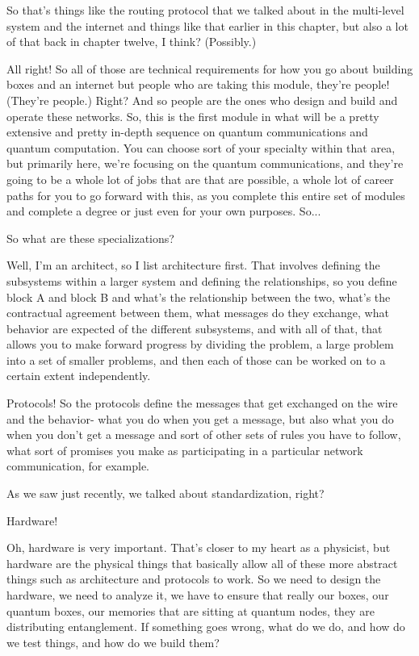 So that's things like the routing protocol that we talked about in the multi-level system and the internet and things like that earlier in this chapter, but also a lot of that back in chapter twelve, I think? (Possibly.)

All right! So all of those are technical requirements for how you go about building boxes and an internet but people who are taking this module, they're people! (They're people.) Right? And so people are the ones who design and build and operate these networks. So, this is the first module in what will be a pretty extensive and pretty in-depth sequence on quantum communications and quantum computation. You can choose sort of your specialty within that area, but primarily here, we're focusing on the quantum communications, and they're going to be a whole lot of jobs that are that are possible, a whole lot of career paths for you to go forward with this, as you complete this entire set of modules and complete a degree or just even for your own purposes. So...

So what are these specializations?

Well, I'm an architect, so I list architecture first. That involves defining the subsystems within a larger system and defining the relationships, so you define block A and block B and what's the relationship between the two, what's the contractual agreement between them, what messages do they exchange, what behavior are expected of the different subsystems, and with all of that, that allows you to make forward progress by dividing the problem, a large problem into a set of smaller problems, and then each of those can be worked on to a certain extent independently.

Protocols! So the protocols define the messages that get exchanged on the wire and the behavior- what you do when you get a message, but also what you do when you don't get a message and sort of other sets of rules you have to follow, what sort of promises you make as participating in a particular network communication, for example.

As we saw just recently, we talked about standardization, right?

Hardware!

Oh, hardware is very important. That's closer to my heart as a physicist, but hardware are the physical things that basically allow all of these more abstract things such as architecture and protocols to work. So we need to design the hardware, we need to analyze it, we have to ensure that really our boxes, our quantum boxes, our memories that are sitting at quantum nodes, they are distributing entanglement. If something goes wrong, what do we do, and how do we test things, and how do we build them?

